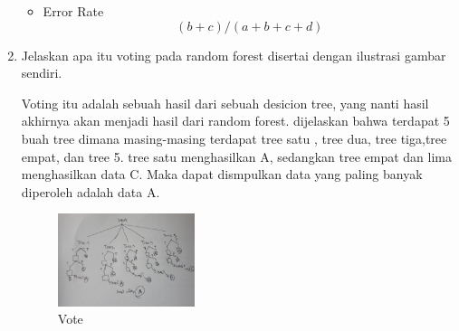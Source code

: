 \begin{enumerate}
\begin{itemize}
                \item Error Rate
                \begin{equation}
                    (b+c)/(a+b+c+d)
                \end{equation}
            \end{itemize}
        \item Jelaskan apa itu voting pada random forest disertai dengan ilustrasi gambar sendiri. \par
        Voting itu adalah sebuah hasil dari sebuah desicion tree, yang nanti hasil  akhirnya akan menjadi hasil dari random forest. dijelaskan bahwa terdapat 5 buah tree dimana masing-masing terdapat tree satu , tree dua, tree tiga,tree empat, dan tree 5. tree satu menghasilkan A, sedangkan tree empat dan lima menghasilkan data C. Maka dapat dismpulkan data yang paling banyak diperoleh adalah data A.
        \begin{figure}[H]
            \includegraphics[width=4cm]{figures/1174039/chapter3/vote.jpeg}
            \centering
            \caption{Vote}
        \end{figure}
    \end{enumerate}
